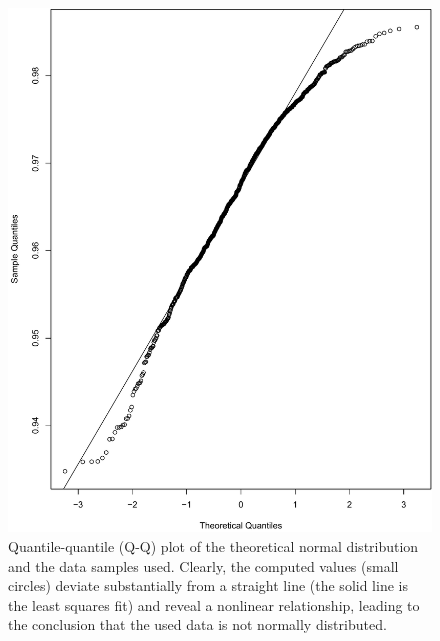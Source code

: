 \begin{figure}[ht]
	\begin{minipage}{0.65\textwidth}
	\includegraphics[width=\textwidth]{fig09}
	\end{minipage}
	\hspace{0.02\textwidth}
	\begin{minipage}{0.30\textwidth}
	\caption{Quantile-quantile (Q-Q) plot of the theoretical normal distribution and the data samples used. Clearly, the computed values (small circles) deviate substantially from a straight line (the solid line is the least squares fit) and reveal a nonlinear relationship, leading to the conclusion that the used data is not normally distributed.}
	\label{ch5_fig9}
	\end{minipage}
\end{figure}
